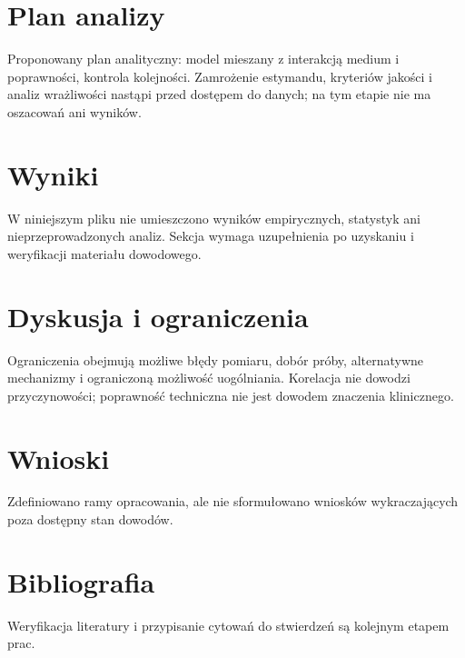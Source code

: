 \documentclass[11pt,a4paper]{article}
\begin{document}
\section{Plan analizy}

Proponowany plan analityczny: model mieszany z interakcją medium i poprawności, kontrola kolejności. Zamrożenie estymandu, kryteriów jakości i analiz wrażliwości nastąpi przed dostępem do danych; na tym etapie nie ma oszacowań ani wyników.

\section{Wyniki}

W niniejszym pliku nie umieszczono wyników empirycznych, statystyk ani nieprzeprowadzonych analiz. Sekcja wymaga uzupełnienia po uzyskaniu i weryfikacji materiału dowodowego.

\section{Dyskusja i ograniczenia}

Ograniczenia obejmują możliwe błędy pomiaru, dobór próby, alternatywne mechanizmy i ograniczoną możliwość uogólniania. Korelacja nie dowodzi przyczynowości; poprawność techniczna nie jest dowodem znaczenia klinicznego.

\section{Wnioski}

Zdefiniowano ramy opracowania, ale nie sformułowano wniosków wykraczających poza dostępny stan dowodów.

\section*{Bibliografia}

Weryfikacja literatury i przypisanie cytowań do stwierdzeń są kolejnym etapem prac.
\end{document}
